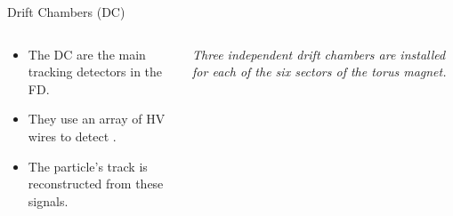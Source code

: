 \begin{frame}{Drift Chambers (DC)}
    \label{10.33::dc}

    \begin{columns}[onlytextwidth,T]

    \begin{column}{.43\linewidth}
        \vspace{36pt}
        \begin{itemize}
            \item
                The DC are the main tracking detectors in the FD.

            \vspace{12pt}
            \item
                They use an array of HV wires to detect .

            \vspace{12pt}
            \item
                The particle's track is reconstructed from these signals.
        \end{itemize}
    \end{column}

    \begin{column}{.55\linewidth}
        \vspace{-12pt}
        \begin{figure}[t]
        \end{figure}
        \vspace{-21pt}
        \scriptsize{\textit{
            Three independent drift chambers are installed for each of the six sectors of the torus magnet.
        }}


\end{column}
\end{columns}
\end{frame}
